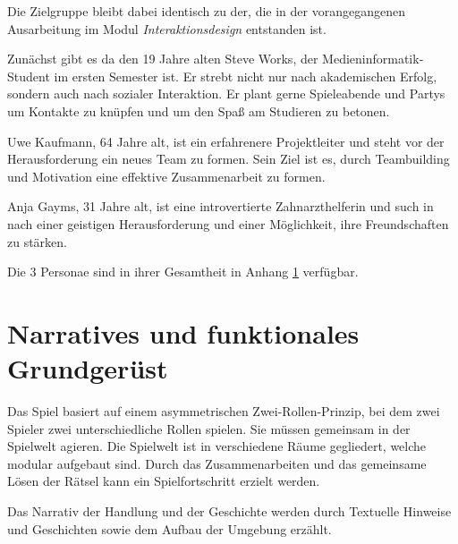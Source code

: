 Die Zielgruppe bleibt dabei identisch zu der, die in der vorangegangenen Ausarbeitung im Modul \emph{Interaktionsdesign} entstanden ist.

Zunächst gibt es da den 19 Jahre alten Steve Works, der Medieninformatik-Student im ersten Semester ist. Er strebt nicht nur nach akademischen Erfolg, sondern auch nach sozialer Interaktion. Er plant gerne Spieleabende und Partys um Kontakte zu knüpfen und um den Spaß am Studieren zu betonen.

Uwe Kaufmann, 64 Jahre alt, ist ein erfahrenere Projektleiter und steht vor der Herausforderung ein neues Team zu formen. Sein Ziel ist es, durch Teambuilding und Motivation eine effektive Zusammenarbeit zu formen.

Anja Gayms, 31 Jahre alt, ist eine introvertierte Zahnarzthelferin und such in  nach einer geistigen Herausforderung und einer Möglichkeit, ihre Freundschaften zu stärken.

Die 3 Personae sind in ihrer Gesamtheit in Anhang \ref{} verfügbar.


\section{Narratives und funktionales Grundgerüst}
Das Spiel basiert auf einem asymmetrischen Zwei-Rollen-Prinzip, bei dem zwei Spieler zwei unterschiedliche Rollen spielen. Sie müssen gemeinsam in der Spielwelt agieren. Die Spielwelt ist in verschiedene Räume gegliedert, welche modular aufgebaut sind. Durch das Zusammenarbeiten und das gemeinsame Lösen der Rätsel kann ein Spielfortschritt erzielt werden.

Das Narrativ der Handlung und der Geschichte werden durch Textuelle Hinweise und Geschichten sowie dem Aufbau der Umgebung erzählt. 



